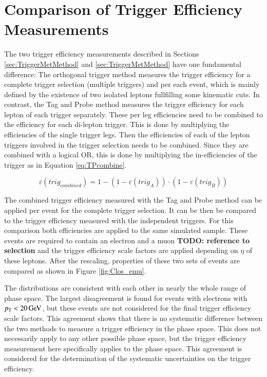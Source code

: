 

\section{Comparison of Trigger Efficiency Measurements}
\label{sec:TriggerComp}

The two trigger efficiency measurements described in Sections \ref{sec:TriggerMetMethod} and \ref{sec:TriggerMetMethod} have one fundamental difference: The orthogonal trigger method measures the trigger efficiency for a complete trigger selection (multiple triggers) and per each event, which is mainly defined by the existence of two isolated leptons fullfilling some kinematic cuts. In contrast, the Tag and Probe method measures the trigger efficiency for each lepton of each trigger separately. These per leg efficiencies need to be combined to the efficiency for each di-lepton trigger. This is done by multiplying the efficiencies of the single trigger legs. 
Then the efficiencies of each of the lepton triggers involved in the trigger selection needs to be combined. Since they are combined with a logical OR, this is done by multiplying the in-efficiencies of the trigger as in Equation \ref{eq:TPcombine}.

\begin{equation}
\varepsilon(trig_{combined}) = 1- (1-\varepsilon(trig_A))\cdot(1- \varepsilon(trig_B))
\label{eq:TPcombine}
\end{equation}

The combined trigger efficiency measured with the Tag and Probe method can be applied per event for the complete trigger selection. It can be then be compared to the trigger efficiency measured with the independent triggers.
For this comparison both efficiencies are applied to the same simulated \ttbar sample. These \ttbar events are required to contain an electron and a muon \textbf{TODO: reference to selection} and the trigger efficiency scale factors are applied depending on $\eta$ of these leptons.
After the rescaling, properties of these two sets of \ttbar events are compared as shown in Figure \ref{fig:Clos_emu}.

The distributions are consistent with each other in nearly the whole range of phase space. The largest disagreement is found for events with electrons with $p_{\mathrm{T}}<20\,\text{Ge\hspace{-.08em}V}$, but these events are not considered for the final trigger efficiency scale factors. This agreement shows that there is no systematic difference between the two methods to measure a trigger efficiency in the \ttbar phase space. This does not necessarily apply to any other possible phase space, but the trigger efficiency measurement here specifically applies to the \ttbar phase space. This agreement is considered for the determination of the systematic uncertainties on the trigger efficiency.

